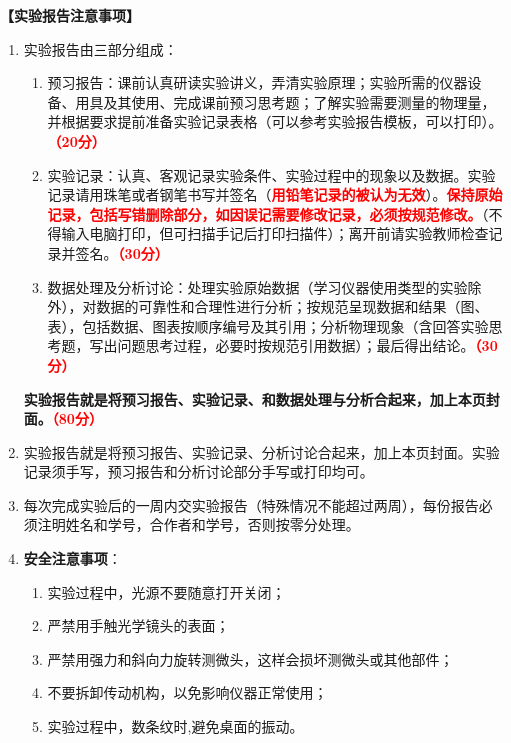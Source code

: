 \documentclass[dvipsnames, svgnames,a4paper,11pt]{article}
\begin{document}
	\textbf{【实验报告注意事项】}
	\begin{enumerate}
		\item 实验报告由三部分组成：
		\begin{enumerate}
			\item 预习报告：课前认真研读实验讲义，弄清实验原理；实验所需的仪器设备、用具及其使用、完成课前预习思考题；了解实验需要测量的物理量，并根据要求提前准备实验记录表格（可以参考实验报告模板，可以打印）。\textcolor{red}{\textbf{（20分）}}
			\item 实验记录：认真、客观记录实验条件、实验过程中的现象以及数据。实验记录请用珠笔或者钢笔书写并签名（\textcolor{red}{\textbf{用铅笔记录的被认为无效}}）。\textcolor{red}{\textbf{保持原始记录，包括写错删除部分，如因误记需要修改记录，必须按规范修改。}}（不得输入电脑打印，但可扫描手记后打印扫描件）；离开前请实验教师检查记录并签名。\textcolor{red}{\textbf{（30分）}}
			\item 数据处理及分析讨论：处理实验原始数据（学习仪器使用类型的实验除外），对数据的可靠性和合理性进行分析；按规范呈现数据和结果（图、表），包括数据、图表按顺序编号及其引用；分析物理现象（含回答实验思考题，写出问题思考过程，必要时按规范引用数据）；最后得出结论。\textcolor{red}{\textbf{（30分）}}
		\end{enumerate}
		\textbf{实验报告就是将预习报告、实验记录、和数据处理与分析合起来，加上本页封面。\textcolor{red}{（80分）}}
		\item 实验报告就是将预习报告、实验记录、分析讨论合起来，加上本页封面。实验记录须手写，预习报告和分析讨论部分手写或打印均可。
		\item 每次完成实验后的一周内交实验报告（特殊情况不能超过两周），每份报告必须注明姓名和学号，合作者和学号，否则按零分处理。 
		\item \textbf{安全注意事项}：
		\begin{enumerate}
			\item 实验过程中，光源不要随意打开关闭；
			\item 严禁用手触光学镜头的表面；
			\item 严禁用强力和斜向力旋转测微头，这样会损坏测微头或其他部件；
			\item 不要拆卸传动机构，以免影响仪器正常使用；
			\item 实验过程中，数条纹时,避免桌面的振动。
			
		\end{enumerate}
	\end{enumerate}
	

	
	
	\clearpage
	\tableofcontents
	\clearpage
	
\end{document}
